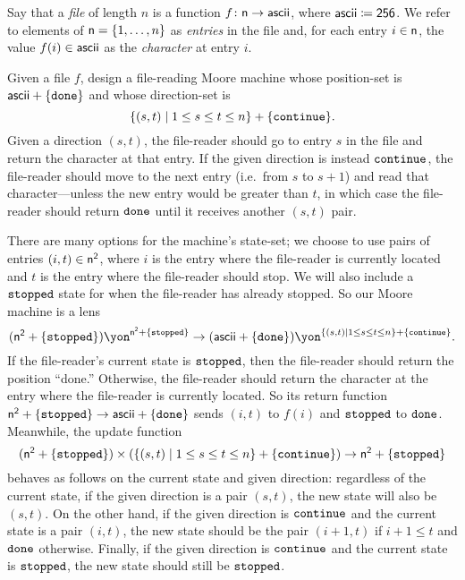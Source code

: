 \documentclass[Book-Poly]{subfiles}
\begin{document}

\begin{exercise}\label{exc.file_reader}
Say that a \emph{file} of length $n$ is a function $f\colon\mathsf{n}\to\mathsf{ascii}$, where $\mathsf{ascii}\coloneqq\textsf{2}\textsf{5}\textsf{6}$.
We refer to elements of $\mathsf{n}=\{1,\ldots,n\}$ as \emph{entries} in the file and, for each entry $i\in\mathsf{n}$, the value $f(i)\in\mathsf{ascii}$ as the \emph{character} at entry $i$.

Given a file $f$, design a file-reading Moore machine whose position-set is $\mathsf{ascii} + \{\texttt{done}\}$
and whose direction-set is
\[
\{(s,t)\mid 1\leq s\leq t\leq n\}+\{\texttt{continue}\}.
\]
Given a direction $(s,t)$, the file-reader should go to entry $s$ in the file and return the character at that entry.
If the given direction is instead $\texttt{continue}$, the file-reader should move to the next entry (i.e.\ from $s$ to $s+1$) and read that character---unless the new entry would be greater than $t$, in which case the file-reader should return $\texttt{done}$ until it receives another $(s,t)$ pair.
\begin{solution}
There are many options for the machine's state-set; we choose to use pairs of entries $(i,t)\in\mathsf{n}^{\textsf{2}}$, where $i$ is the entry where the file-reader is currently located and $t$ is the entry where the file-reader should stop.
We will also include a $\texttt{stopped}$ state for when the file-reader has already stopped.
So our Moore machine is a lens
\[
    (\ord{n}^\2+\{\const{stopped}\})\yon^{\ord{n}^\2+\{\const{stopped}\}} \to (\Set{ascii} + \{\const{done}\})\yon^{\{(s,t)\mid 1\leq s\leq t\leq n\}+\{\const{continue}\}}.
\]
If the file-reader's current state is $\texttt{stopped}$, then the file-reader should return the position ``done.''
Otherwise, the file-reader should return the character at the entry where the file-reader is currently located.
So its return function $\mathsf{n}^{\textsf{2}}+\{\texttt{stopped}\} \to \mathsf{ascii} + \{\texttt{done}\}$ sends $(i, t)$ to $f(i)$ and $\texttt{stopped}$ to $\texttt{done}$.
Meanwhile, the update function
\[
    (\mathsf{n}^{\textsf{2}}+\{\texttt{stopped}\}) \times (\{(s,t)\mid 1\leq s\leq t\leq n\}+\{\texttt{continue}\}) \to \mathsf{n}^{\textsf{2}}+\{\texttt{stopped}\}
\]
behaves as follows on the current state and given direction: regardless of the current state, if the given direction is a pair $(s,t)$, the new state will also be $(s,t)$.
On the other hand, if the given direction is $\texttt{continue}$ and the current state is a pair $(i,t)$, the new state should be the pair $(i+1,t)$ if $i+1\leq t$ and $\texttt{done}$ otherwise.
Finally, if the given direction is $\texttt{continue}$ and the current state is $\texttt{stopped}$, the new state should still be $\texttt{stopped}$.
\end{solution}
\end{exercise}
\end{document}
